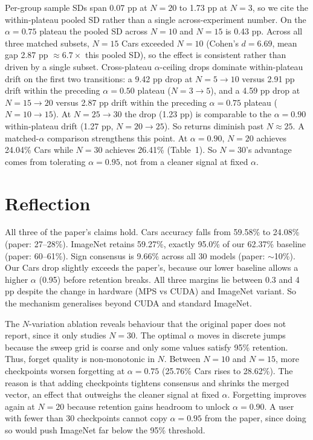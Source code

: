 \documentclass{article}
\begin{document}
Per-group sample SDs span 0.07 pp at $N=20$ to 1.73 pp at $N=3$, so we cite the within-plateau pooled SD rather than a single across-experiment number. On the $\alpha=0.75$ plateau the pooled SD across $N=10$ and $N=15$ is 0.43 pp. Across all three matched subsets, $N=15$ Cars exceeded $N=10$ (Cohen's $d=6.69$, mean gap 2.87 pp $\approx 6.7\times$ this pooled SD), so the effect is consistent rather than driven by a single subset. Cross-plateau $\alpha$-ceiling drops dominate within-plateau drift on the first two transitions: a 9.42 pp drop at $N=5 \to 10$ versus 2.91 pp drift within the preceding $\alpha=0.50$ plateau ($N=3 \to 5$), and a 4.59 pp drop at $N=15 \to 20$ versus 2.87 pp drift within the preceding $\alpha=0.75$ plateau ($N=10 \to 15$). At $N=25 \to 30$ the drop (1.23 pp) is comparable to the $\alpha=0.90$ within-plateau drift (1.27 pp, $N=20 \to 25$). So returns diminish past $N \approx 25$. A matched-$\alpha$ comparison strengthens this point. At $\alpha=0.90$, $N=20$ achieves 24.04\% Cars while $N=30$ achieves 26.41\% (Table~1). So $N=30$'s advantage comes from tolerating $\alpha=0.95$, not from a cleaner signal at fixed $\alpha$.

\section{Reflection}

All three of the paper's claims hold. Cars accuracy falls from 59.58\% to 24.08\% (paper: 27--28\%). ImageNet retains 59.27\%, exactly 95.0\% of our 62.37\% baseline (paper: 60--61\%). Sign consensus is 9.66\% across all 30 models (paper: $\sim$10\%). Our Cars drop slightly exceeds the paper's, because our lower baseline allows a higher $\alpha$ (0.95) before retention breaks. All three margins lie between 0.3 and 4 pp despite the change in hardware (MPS vs CUDA) and ImageNet variant. So the mechanism generalises beyond CUDA and standard ImageNet.

The $N$-variation ablation reveals behaviour that the original paper does not report, since it only studies $N = 30$. The optimal $\alpha$ moves in discrete jumps because the sweep grid is coarse and only some values satisfy 95\% retention. Thus, forget quality is non-monotonic in $N$. Between $N = 10$ and $N = 15$, more checkpoints worsen forgetting at $\alpha = 0.75$ (25.76\% Cars rises to 28.62\%). The reason is that adding checkpoints tightens consensus and shrinks the merged vector, an effect that outweighs the cleaner signal at fixed $\alpha$. Forgetting improves again at $N = 20$ because retention gains headroom to unlock $\alpha = 0.90$. A user with fewer than 30 checkpoints cannot copy $\alpha = 0.95$ from the paper, since doing so would push ImageNet far below the 95\% threshold.
\end{document}

